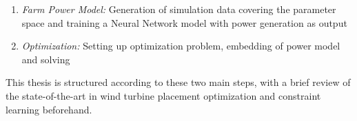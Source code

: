 \begin{enumerate}
	\item \textit{Farm Power Model:} Generation of simulation data covering the parameter space and training a Neural Network model with power generation as output
	\item \textit{Optimization:} Setting up optimization problem, embedding of power model and solving
\end{enumerate}

This thesis is structured according to these two main steps, with a brief review of the state-of-the-art in wind turbine placement optimization and constraint learning beforehand. 